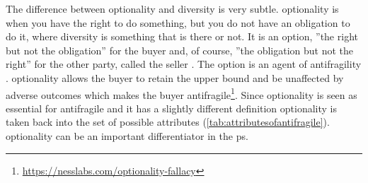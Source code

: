 The difference between \gls{optionality} and \gls{diversity} is very subtle. \Gls{optionality} is when you have the right to do something, but you do not have an obligation to do it, where diversity is something that is there or not. It is an option, ''the right but not the obligation'' for the buyer and, of course, ''the obligation but not the right'' for the other party, called the seller \parencite[p.~174]{Taleb2012}. The option is an agent of \gls{antifragility} \parencite[p.~174]{Taleb2012}. \Gls{optionality} allows the buyer to retain the upper bound and be unaffected by adverse outcomes which makes the buyer \gls{antifragile}\footnote{\label{foot:nesslabs}\url{https://nesslabs.com/optionality-fallacy}}. Since \gls{optionality} is seen as essential for \gls{antifragile} and it has a slightly different definition \gls{optionality} is taken back into the set of possible attributes (\cref{tab:attributesofantifragile}). \Gls{optionality} can be an important differentiator in the \gls{ps}.

